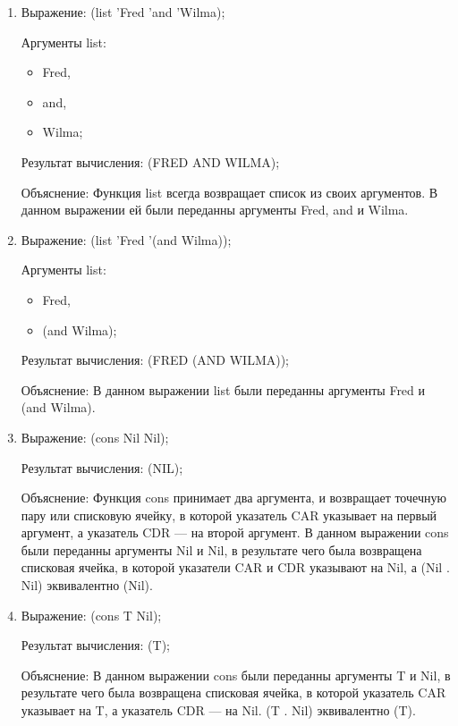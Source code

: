 \documentclass[a4paper,oneside,14pt]{extarticle}
\begin{document}
\begin{enumerate}
    \item 
        Выражение: (list 'Fred 'and 'Wilma);

        Аргументы list:
        \begin{itemize}
            \item Fred,
            \item and,
            \item Wilma;
        \end{itemize}

        Результат вычисления: (FRED AND WILMA);

        Объяснение: Функция list всегда возвращает список из своих аргументов. В данном выражении ей были переданны аргументы Fred, and и Wilma.

    \item 
        Выражение: (list 'Fred '(and Wilma));

        Аргументы list:
        \begin{itemize}
            \item Fred,
            \item (and Wilma);
        \end{itemize}

        Результат вычисления: (FRED (AND WILMA));

        Объяснение:
        В данном выражении list были переданны аргументы Fred и (and Wilma).

    \item 
        Выражение: (cons Nil Nil);

        Результат вычисления: (NIL);

        Объяснение: Функция cons принимает два аргумента, и возвращает точечную пару или списковую ячейку, в которой указатель CAR указывает на первый аргумент, а указатель CDR --- на второй аргумент. В данном выражении cons были переданны аргументы Nil и Nil, в результате чего была возвращена списковая ячейка, в которой указатели CAR и CDR указывают на Nil, а (Nil . Nil) эквивалентно (Nil).

    \item 
        Выражение: (cons T Nil);

        Результат вычисления: (T);

        Объяснение: В данном выражении cons были переданны аргументы T и Nil, в результате чего была возвращена списковая ячейка, в которой указатель CAR указывает на T, а указатель CDR --- на Nil. (T . Nil) эквивалентно (T).


\end{enumerate}
\end{document}
